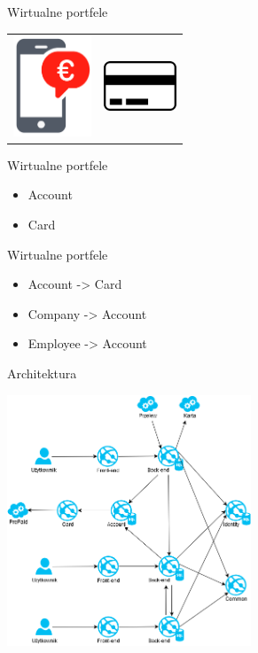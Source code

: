 \documentclass{beamer}
\begin{document}
\begin{frame}{Wirtualne portfele}
	\begin{center}
		\begin{tabular}{ c c }
  			\includegraphics[height=3cm]{wallet2.png} & \includegraphics[height=1.5cm]{prepaid1.png}
		\end{tabular}
	\end{center}
\end{frame}

\begin{frame}{Wirtualne portfele}
	\begin{huge}
		\begin{itemize}[<+->]
			\item Account
			\item Card
		\end{itemize}
	\end{huge}
\end{frame}

\begin{frame}{Wirtualne portfele}
	\begin{huge}
		\begin{itemize}[<+->]
			\item Account -> Card
			\item Company -> Account
			\item Employee -> Account
		\end{itemize}
	\end{huge}
\end{frame}

\begin{frame}{Architektura}
	\begin{center}
		\includegraphics[height=7.5cm]{architektura5.png}
	\end{center}
\end{frame}
\end{document}
